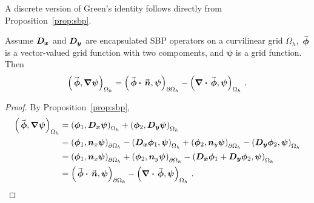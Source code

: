A discrete version of Green's identity follows directly from Proposition~\ref{prop:sbp}.

\begin{proposition}%
  \label{prop:discrete_greens_identity}
  Assume $\bm{D_x}$ and $\bm{D_y}$ are encapsulated SBP operators on a curvilinear grid $\Omega_h$, $\phin$ is a vector-valued grid function with two compoments, and $\bm{\psi}$ is a grid function. Then
  \begin{equation*}
    \ipn{\phin}{\nablan \bm{\psi}} = \ipbnfull{\phin \cdotn \nn}{\bm{\psi}} - \ipn{\divn \phin}{\bm{\psi}} \,.
  \end{equation*}
\end{proposition}
\begin{proof}
  By Proposition~\ref{prop:sbp},
  \begin{align*}
    \ipn{\phin}{\nablan \bm{\psi}}
      &= \ipn{\bm{\phi}_1}{\Dx \bm{\psi}} + \ipn{\bm{\phi}_2}{\Dy \bm{\psi}} \\
      &= \ipbnfull{\bm{\phi}_1}{\nnx \bm{\psi}} - \ipn{\Dx \bm{\phi}_1}{\bm{\psi}} + \ipbnfull{\bm{\phi}_2}{\nny \bm{\psi}} - \ipn{\Dy \bm{\phi}_2}{\bm{\psi}} \\
      &= \ipbnfull{\bm{\phi}_1}{\nnx \bm{\psi}} + \ipbnfull{\bm{\phi}_2}{\nny \bm{\psi}} - \ipn{\Dx \bm{\phi}_1 + \Dy \bm{\phi}_2}{\bm{\psi}} \\
      &= \ipbnfull{\phin \cdotn \nn}{\bm{\psi}} - \ipn{\divn \phin}{\bm{\psi}} \,.
  \end{align*}
\end{proof}
